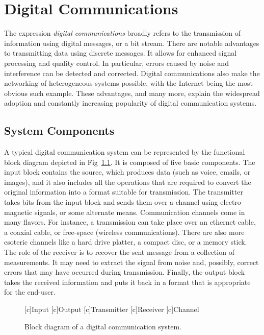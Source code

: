 \chapter{Digital Communications}

The expression \emph{digital communications} broadly refers to the transmission of information using digital messages, or a bit stream.
There are notable advantages to transmitting data  using discrete messages.
It allows for enhanced signal processing and quality control.
In particular, errors caused by noise and interference can be detected and corrected.
Digital communications also make the networking of heterogeneous systems possible, with the Internet being the most obvious such example.
These advantages, and many more, explain the widespread adoption and constantly increasing popularity of digital communication systems.


\section{System Components}

A typical digital communication system can be represented by the functional block diagram depicted in Fig~\ref{figure:BlockDiagram}.
It is composed of five basic components.
The input block contains the source, which produces data (such as voice, emails, or images), and it also includes all the operations that are required to convert the original information into a format suitable for transmission.
The transmitter takes bits from the input block and sends them over a channel using electro-magnetic signals, or some alternate means.
Communication channels come in many flavors.
For instance, a transmission can take place over an ethernet cable, a coaxial cable, or free-space (wireless communications).
There are also more esoteric channels like a hard drive platter, a compact disc, or a memory stick.
The role of the receiver is to recover the sent message from a collection of measurements.
It may need to extract the signal from noise and, possibly, correct errors that may have occurred during transmission.
Finally, the output block takes the received information and puts it back in a format that is appropriate for the end-user.

\begin{figure}[htbp]
\begin{center}
\begin{psfrags}
[c]{Input}
[c]{Output}
[c]{Transmitter}
[c]{Receiver}
[c]{Channel}
\end{psfrags}
\end{center}
\caption{Block diagram of a digital communication system.}
\label{figure:BlockDiagram}
\end{figure}

